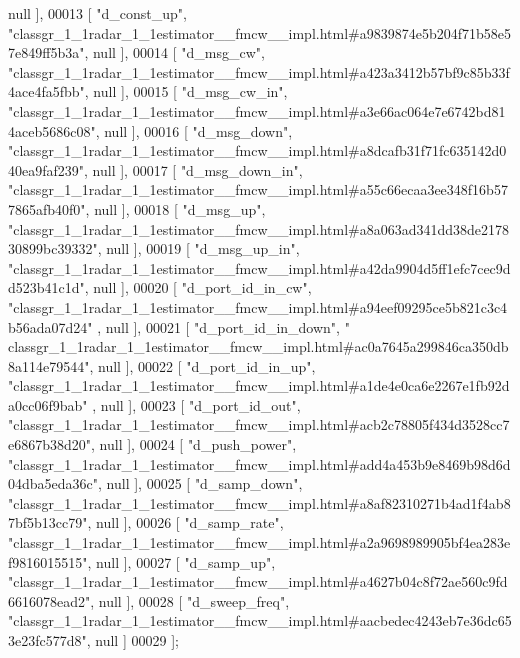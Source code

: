 \begin{DoxyCode}
      null ],
00013     [ \textcolor{stringliteral}{"d\_const\_up"}, \textcolor{stringliteral}{"classgr\_1\_1radar\_1\_1estimator\_\_fmcw\_\_impl.html#a9839874e5b204f71b58e57e849ff5b3a"}, 
      null ],
00014     [ \textcolor{stringliteral}{"d\_msg\_cw"}, \textcolor{stringliteral}{"classgr\_1\_1radar\_1\_1estimator\_\_fmcw\_\_impl.html#a423a3412b57bf9c85b33f4ace4fa5fbb"}, null 
      ],
00015     [ \textcolor{stringliteral}{"d\_msg\_cw\_in"}, \textcolor{stringliteral}{"classgr\_1\_1radar\_1\_1estimator\_\_fmcw\_\_impl.html#a3e66ac064e7e6742bd814aceb5686c08"}, 
      null ],
00016     [ \textcolor{stringliteral}{"d\_msg\_down"}, \textcolor{stringliteral}{"classgr\_1\_1radar\_1\_1estimator\_\_fmcw\_\_impl.html#a8dcafb31f71fc635142d040ea9faf239"}, 
      null ],
00017     [ \textcolor{stringliteral}{"d\_msg\_down\_in"}, \textcolor{stringliteral}{"classgr\_1\_1radar\_1\_1estimator\_\_fmcw\_\_impl.html#a55c66ecaa3ee348f16b577865afb40f0"}, 
      null ],
00018     [ \textcolor{stringliteral}{"d\_msg\_up"}, \textcolor{stringliteral}{"classgr\_1\_1radar\_1\_1estimator\_\_fmcw\_\_impl.html#a8a063ad341dd38de217830899bc39332"}, null 
      ],
00019     [ \textcolor{stringliteral}{"d\_msg\_up\_in"}, \textcolor{stringliteral}{"classgr\_1\_1radar\_1\_1estimator\_\_fmcw\_\_impl.html#a42da9904d5ff1efc7cec9dd523b41c1d"}, 
      null ],
00020     [ \textcolor{stringliteral}{"d\_port\_id\_in\_cw"}, \textcolor{stringliteral}{"classgr\_1\_1radar\_1\_1estimator\_\_fmcw\_\_impl.html#a94eef09295ce5b821c3c4b56ada07d24"}
      , null ],
00021     [ \textcolor{stringliteral}{"d\_port\_id\_in\_down"}, \textcolor{stringliteral}{"
      classgr\_1\_1radar\_1\_1estimator\_\_fmcw\_\_impl.html#ac0a7645a299846ca350db8a114e79544"}, null ],
00022     [ \textcolor{stringliteral}{"d\_port\_id\_in\_up"}, \textcolor{stringliteral}{"classgr\_1\_1radar\_1\_1estimator\_\_fmcw\_\_impl.html#a1de4e0ca6e2267e1fb92da0cc06f9bab"}
      , null ],
00023     [ \textcolor{stringliteral}{"d\_port\_id\_out"}, \textcolor{stringliteral}{"classgr\_1\_1radar\_1\_1estimator\_\_fmcw\_\_impl.html#acb2c78805f434d3528cc7e6867b38d20"}, 
      null ],
00024     [ \textcolor{stringliteral}{"d\_push\_power"}, \textcolor{stringliteral}{"classgr\_1\_1radar\_1\_1estimator\_\_fmcw\_\_impl.html#add4a453b9e8469b98d6d04dba5eda36c"}, 
      null ],
00025     [ \textcolor{stringliteral}{"d\_samp\_down"}, \textcolor{stringliteral}{"classgr\_1\_1radar\_1\_1estimator\_\_fmcw\_\_impl.html#a8af82310271b4ad1f4ab87bf5b13cc79"}, 
      null ],
00026     [ \textcolor{stringliteral}{"d\_samp\_rate"}, \textcolor{stringliteral}{"classgr\_1\_1radar\_1\_1estimator\_\_fmcw\_\_impl.html#a2a9698989905bf4ea283ef9816015515"}, 
      null ],
00027     [ \textcolor{stringliteral}{"d\_samp\_up"}, \textcolor{stringliteral}{"classgr\_1\_1radar\_1\_1estimator\_\_fmcw\_\_impl.html#a4627b04c8f72ae560c9fd6616078ead2"}, null
       ],
00028     [ \textcolor{stringliteral}{"d\_sweep\_freq"}, \textcolor{stringliteral}{"classgr\_1\_1radar\_1\_1estimator\_\_fmcw\_\_impl.html#aacbedec4243eb7e36dc653e23fc577d8"}, 
      null ]
00029 ];
\end{DoxyCode}
